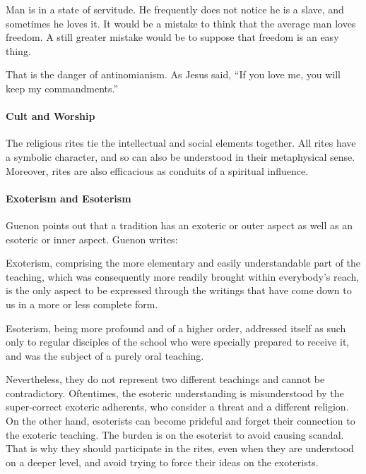 \begin{quotex}
Man is in a state of servitude. He frequently does not notice he is a slave, and sometimes he loves it. It would be a mistake to think that the average man loves freedom. A still greater mistake would be to suppose that freedom is an easy thing.
\end{quotex}


That is the danger of antinomianism. As Jesus said, ``If you love me, you will keep my commandments.''

\paragraph{Cult and Worship}


The religious rites tie the intellectual and social elements together. All rites have a symbolic character, and so can also be understood in their metaphysical sense. Moreover, rites are also efficacious as conduits of a spiritual influence.

\paragraph{Exoterism and Esoterism}


Guenon points out that a tradition has an exoteric or outer aspect as well as an esoteric or inner aspect. Guenon writes:

\begin{quotex}
Exoterism, comprising the more elementary and easily understandable part of the teaching, which was consequently more readily brought within everybody's reach, is the only aspect to be expressed through the writings that have come down to us in a more or less complete form.

Esoterism, being more profound and of a higher order, addressed itself as such only to regular disciples of the school who were specially prepared to receive it, and was the subject of a purely oral teaching.
\end{quotex}


Nevertheless, they do not represent two different teachings and cannot be contradictory. Oftentimes, the esoteric understanding is misunderstood by the super-correct exoteric adherents, who consider a threat and a different religion. On the other hand, esoterists can become prideful and forget their connection to the exoteric teaching. The burden is on the esoterist to avoid causing scandal. That is why they should participate in the rites, even when they are understood on a deeper level, and avoid trying to force their ideas on the exoterists.

